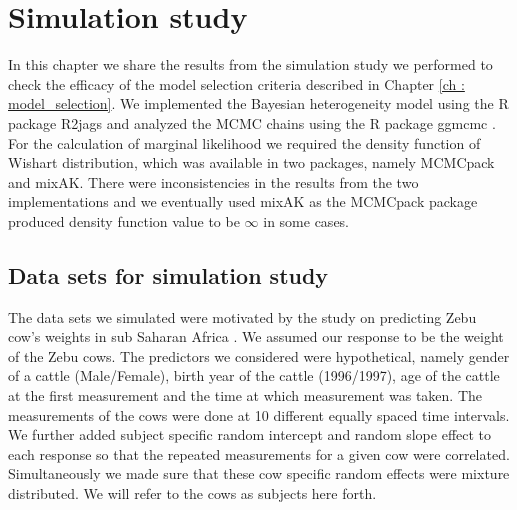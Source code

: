 
\chapter{Simulation study}
\label{ch : simulation_study}

In this chapter we share the results from the simulation study we performed to check the efficacy of the model selection criteria described in Chapter \ref{ch : model_selection}. We implemented the Bayesian heterogeneity model using the R package R2jags \citep{su_r2jags:_2015} and analyzed the MCMC chains using the R package ggmcmc \citep{marin_ggmcmc:_2016}. For the calculation of marginal likelihood we required the density function of Wishart distribution, which was available in two packages, namely MCMCpack and mixAK. There were inconsistencies in the results from the two implementations and we eventually used mixAK \citep{komarek_mixak:_2015} as the MCMCpack package produced density function value to be $\infty$ in some cases.

\section{Data sets for simulation study}
The data sets we simulated were motivated by the study on predicting Zebu cow's weights in sub Saharan Africa \citep{lesosky_live_2012}. We assumed our response to be the weight of the Zebu cows. The predictors we considered were hypothetical, namely gender of a cattle (Male/Female), birth year of the cattle (1996/1997), age of the cattle at the first measurement and the time at which measurement was taken. The measurements of the cows were done at 10 different equally spaced time intervals. We further added subject specific random intercept and random slope effect to each response so that the repeated measurements for a given cow were correlated. Simultaneously we made sure that these cow specific random effects were mixture distributed. We will refer to the cows as subjects here forth.

